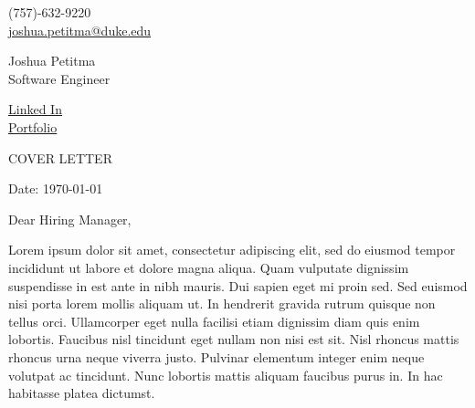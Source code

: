 \documentclass[11pt,a4]{article}
\begin{document}
\begin{center}
    \begin{minipage}[b]{0.24\textwidth}
            \large (757)-632-9220 \\
            \large \href{mailto:joshua.petitma@duke.edu}{joshua.petitma@duke.edu} 
    \end{minipage}%
    \begin{minipage}[b]{0.5\textwidth}
            \centering
            {\Huge Joshua Petitma} \\ %
            \vspace{0.1cm}
            {\color{UI_blue} \Large{Software Engineer}} \\
    \end{minipage}%
    \begin{minipage}[b]{0.24\textwidth}
            \flushright \large
            {\underline{\href{https://www.linkedin.com/in/joshua-petitma/}{Linked In}}} \\
            \underline{\href{https://josh.petit.dev}{Portfolio}}
    \end{minipage}   
    
\vspace{-0.15cm} 
{\color{UI_blue} \hrulefill}
\end{center}

\justify
\setlength{\parindent}{0pt}
\setlength{\parskip}{12pt}
\vspace{0.2cm}
\begin{center}
    {\color{UI_blue} \Large{COVER LETTER}}
\end{center}



Date: \today \par \vspace{-0.1cm}
Dear Hiring Manager, %

Lorem ipsum dolor sit amet, consectetur adipiscing elit, sed do eiusmod tempor incididunt ut labore et dolore magna aliqua. Quam vulputate dignissim suspendisse in est ante in nibh mauris. Dui sapien eget mi proin sed. Sed euismod nisi porta lorem mollis aliquam ut. In hendrerit gravida rutrum quisque non tellus orci. Ullamcorper eget nulla facilisi etiam dignissim diam quis enim lobortis. Faucibus nisl tincidunt eget nullam non nisi est sit. Nisl rhoncus mattis rhoncus urna neque viverra justo. Pulvinar elementum integer enim neque volutpat ac tincidunt. Nunc lobortis mattis aliquam faucibus purus in. In hac habitasse platea dictumst. \par
\end{document}

